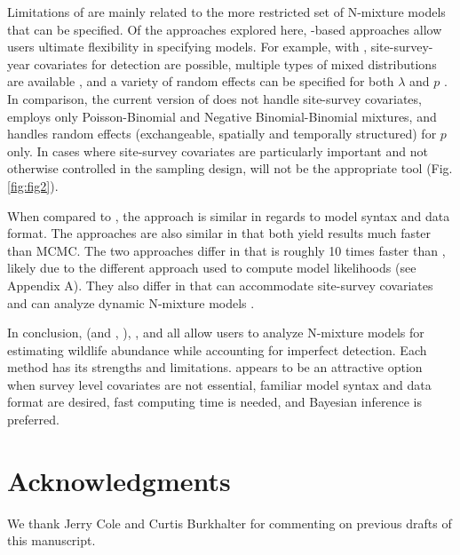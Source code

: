 \documentclass[article]{jss}
\begin{document}
Limitations of  are mainly related to the more restricted set of N-mixture models that can be specified. Of the approaches explored here, -based approaches allow users ultimate flexibility in specifying models. For example, with , site-survey-year covariates for detection are possible, multiple types of mixed distributions are available \citep{Joseph_Elkin_Martin_Possingham_2009,Martin_Royle_Mackenzie_Edwards_Kery_Gardner_2011}, and a variety of random effects can be specified for both $\lambda$ and $p$ \citep{Kery_Schaub_2011}. In comparison, the current version of  does not handle site-survey covariates, employs only Poisson-Binomial and Negative Binomial-Binomial mixtures, and handles random effects (exchangeable, spatially and temporally structured) for $p$ only. In cases where site-survey covariates are particularly important and not otherwise controlled in the sampling design,  will not be the appropriate tool (Fig. \ref{fig:fig2}).

When compared to , the  approach is similar in regards to model syntax and data format. The approaches are also similar in that both yield results much faster than MCMC. The two approaches differ in that  is roughly 10 times faster than , likely due to the different approach used to compute model likelihoods (see Appendix A). They also differ in that  can accommodate site-survey covariates and can analyze dynamic N-mixture models \citep{Chandler_Royle_King_2011, Dail_Madsen_2011}.

In conclusion,  (and , ), , and  all allow users to analyze N-mixture models for estimating wildlife abundance while accounting for imperfect detection. Each method has its strengths and limitations.  appears to be an attractive option when survey level covariates are not essential, familiar model syntax and data format are desired, fast computing time is needed, and Bayesian inference is preferred.

\section*{Acknowledgments}
We thank Jerry Cole and Curtis Burkhalter for commenting on previous drafts of this manuscript.


\end{document}
